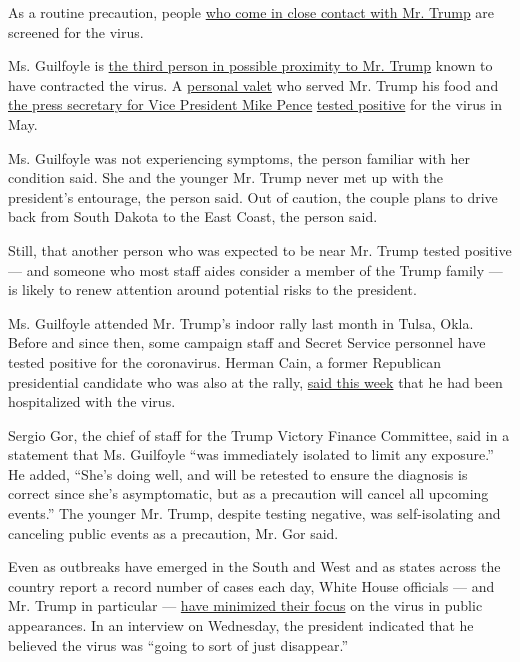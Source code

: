 As a routine precaution, people
\href{https://www.nytimes3xbfgragh.onion/2020/05/01/us/politics/coronavirus-testing-senate-white-house.html}{who
come in close contact with Mr. Trump} are screened for the virus.

Ms. Guilfoyle is
\href{https://www.nytimes3xbfgragh.onion/2020/05/10/us/politics/white-house-coronavirus-trump.html}{the
third person in possible proximity to Mr. Trump} known to have
contracted the virus. A
\href{https://www.nytimes3xbfgragh.onion/2020/05/07/us/politics/coronavirus-white-house-military-aide.html}{personal
valet} who served Mr. Trump his food and
\href{https://www.nytimes3xbfgragh.onion/2020/05/08/us/politics/white-house-coronavirus-safety.html}{the
press secretary for Vice President Mike Pence}
\href{https://www.nytimes3xbfgragh.onion/2020/05/08/us/politics/white-house-coronavirus-safety.html}{tested
positive} for the virus in May.

Ms. Guilfoyle was not experiencing symptoms, the person familiar with
her condition said. She and the younger Mr. Trump never met up with the
president's entourage, the person said. Out of caution, the couple plans
to drive back from South Dakota to the East Coast, the person said.

Still, that another person who was expected to be near Mr. Trump tested
positive --- and someone who most staff aides consider a member of the
Trump family --- is likely to renew attention around potential risks to
the president.

Ms. Guilfoyle attended Mr. Trump's indoor rally last month in Tulsa,
Okla. Before and since then, some campaign staff and Secret Service
personnel have tested positive for the coronavirus. Herman Cain, a
former Republican presidential candidate who was also at the rally,
\href{https://www.nytimes3xbfgragh.onion/2020/07/02/us/politics/herman-cain-coronavirus.html}{said
this week} that he had been hospitalized with the virus.

Sergio Gor, the chief of staff for the Trump Victory Finance Committee,
said in a statement that Ms. Guilfoyle ``was immediately isolated to
limit any exposure.'' He added, ``She's doing well, and will be retested
to ensure the diagnosis is correct since she's asymptomatic, but as a
precaution will cancel all upcoming events.'' The younger Mr. Trump,
despite testing negative, was self-isolating and canceling public events
as a precaution, Mr. Gor said.

Even as outbreaks have emerged in the South and West and as states
across the country report a record number of cases each day, White House
officials --- and Mr. Trump in particular ---
\href{https://www.nytimes3xbfgragh.onion/2020/06/26/us/politics/trump-coronavirus.html}{have
minimized their focus} on the virus in public appearances. In an
interview on Wednesday, the president indicated that he believed the
virus was ``going to sort of just disappear.''

